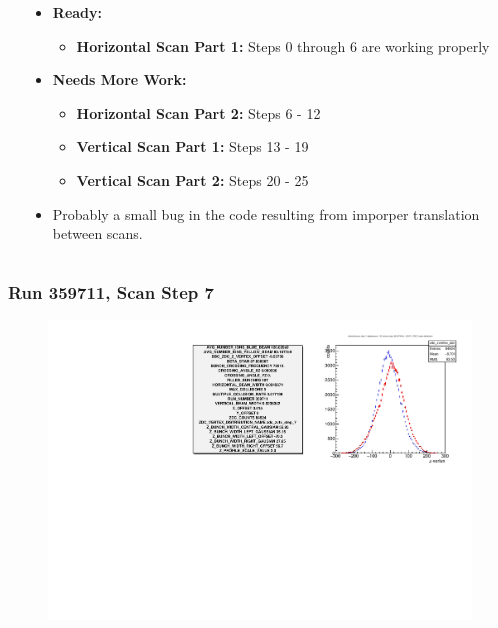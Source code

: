 \begin{frame}
\begin{columns}[onlytextwidth]
\begin{column}{0.5\textwidth}
{\begin{tabular}{c c c c c}
  \bottomrule
  \end{tabular}
  }
\end{column}
\begin{column}{0.5\textwidth}
	\begin{itemize}
		\item\textbf{Ready:}
			\begin{itemize}
				\item \textbf{Horizontal Scan Part 1:} Steps 0 through 6 are working properly
			\end{itemize}
		\item\textbf{Needs More Work:}
				\begin{itemize}
					\item \textbf{Horizontal Scan Part 2:} Steps 6 - 12
					\item \textbf{Vertical Scan Part 1: } Steps 13 - 19
					\item \textbf{Vertical Scan Part 2: } Steps 20 - 25
				\end{itemize}
		\item Probably a small bug in the code resulting from imporper translation
			between scans.
		\end{itemize}
\end{column}
\end{columns}
\end{frame}

\begin{frame}
\frametitle{Run 359711, Scan Step 7}
\begin{figure}
\begin{center}
\includegraphics[width=\linewidth]{"figures/359711_step_7_zdc_zvertex"}
\caption{ }
\label{fig:359711_step_7_zdc_zvertex}
\end{center}\end{figure}
\end{frame}

